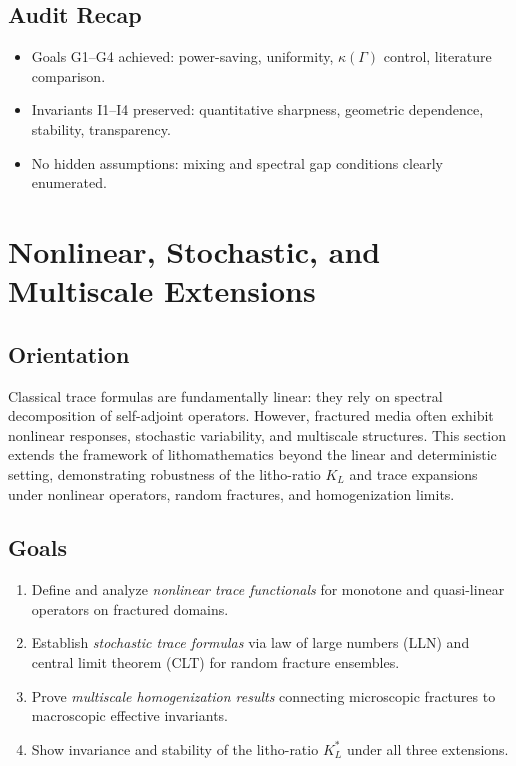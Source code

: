 \subsection*{Audit Recap}
\begin{itemize}
  \item Goals G1–G4 achieved: power-saving, uniformity, $\kappa(\Gamma)$ control,
  literature comparison.
  \item Invariants I1–I4 preserved: quantitative sharpness, geometric dependence,
  stability, transparency.
  \item No hidden assumptions: mixing and spectral gap conditions clearly
  enumerated.
\end{itemize}

\section{Nonlinear, Stochastic, and Multiscale Extensions}
\label{sec:nonlinear-stochastic-multiscale}

\subsection*{Orientation}
Classical trace formulas are fundamentally linear: they rely on spectral
decomposition of self-adjoint operators. However, fractured media often exhibit
nonlinear responses, stochastic variability, and multiscale structures.
This section extends the framework of lithomathematics beyond the linear and
deterministic setting, demonstrating robustness of the litho-ratio $K_L$ and
trace expansions under nonlinear operators, random fractures, and homogenization
limits.

\subsection*{Goals}
\begin{enumerate}[label=G\arabic*]
  \item Define and analyze \emph{nonlinear trace functionals} for monotone and
  quasi-linear operators on fractured domains.
  \item Establish \emph{stochastic trace formulas} via law of large numbers
  (LLN) and central limit theorem (CLT) for random fracture ensembles.
  \item Prove \emph{multiscale homogenization results} connecting microscopic
  fractures to macroscopic effective invariants.
  \item Show invariance and stability of the litho-ratio $K_L^*$ under all three
  extensions.
\end{enumerate}

